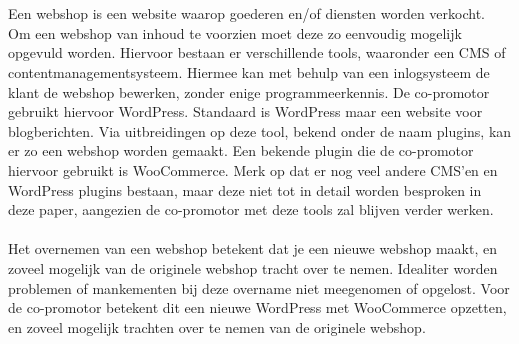 
\chapter{}%
\label{ch:inleiding}

%

Een webshop is een website waarop goederen en/of diensten worden verkocht. Om een webshop van inhoud te voorzien moet deze zo eenvoudig mogelijk opgevuld worden. Hiervoor bestaan er verschillende tools, waaronder een CMS of contentmanagementsysteem. Hiermee kan met behulp van een inlogsysteem de klant de webshop bewerken, zonder enige programmeerkennis. De co-promotor gebruikt hiervoor WordPress. Standaard is WordPress maar een website voor blogberichten. Via uitbreidingen op deze tool, bekend onder de naam plugins, kan er zo een webshop worden gemaakt. Een bekende plugin die de co-promotor hiervoor gebruikt is WooCommerce. Merk op dat er nog veel andere CMS'en en WordPress plugins bestaan, maar deze niet tot in detail worden besproken in deze paper, aangezien de co-promotor met deze tools zal blijven verder werken. 
\\\\
Het overnemen van een webshop betekent dat je een nieuwe webshop maakt, en zoveel mogelijk van de originele webshop tracht over te nemen. Idealiter worden problemen of mankementen bij deze overname niet meegenomen of opgelost. Voor de co-promotor betekent dit een nieuwe WordPress met WooCommerce opzetten, en zoveel mogelijk trachten over te nemen van de originele webshop.


